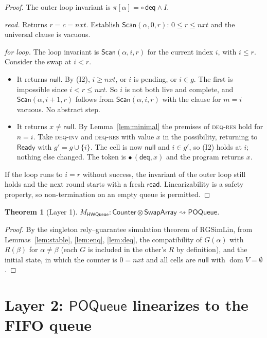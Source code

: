 \documentclass[11pt]{article}
\newtheorem{theorem}[lemma]{Theorem}
\theoremstyle{definition}
\theoremstyle{remark}
\newcommand{\dom}{\mathop{\mathrm{dom}}}
\newcommand{\Ready}{\mathsf{Ready}}
\newcommand{\Deq}{\mathsf{deq}}
\newcommand{\Read}{\mathsf{read}}
\newcommand{\nul}{\mathsf{null}}
\newcommand{\Scan}{\mathsf{Scan}}
\newcommand{\tokens}{\pi}
\newcommand{\Counter}{\mathsf{Counter}}
\newcommand{\SwapArray}{\mathsf{SwapArray}}
\newcommand{\POQueue}{\mathsf{POQueue}}
\newcommand{\HWQ}{\mathsf{HWQueue}}
\newcommand{\refines}{\rightsquigarrow}
\newcommand{\tok}[1]{\circ\,#1}
\newcommand{\done}[2]{\bullet\,(#1,#2)}
\begin{document}
\begin{proof}
The outer loop invariant is $\tokens[\alpha] = \tok{\Deq} \wedge I$.

\emph{read.}  Returns $r = c = \mathit{nxt}$.  Establish $\Scan(\alpha, 0, r)$:
$0 \le r \le \mathit{nxt}$ and the universal clause is vacuous.

\emph{for loop.}  The loop invariant is $\Scan(\alpha, i, r)$ for the current
index $i$, with $i \le r$.  Consider the swap at $i < r$.
\begin{itemize}[nosep]
\item It returns $\nul$.  By (I2), $i \ge \mathit{nxt}$, or $i$ is
  pending, or $i \in g$.  The first is impossible since $i < r \le
  \mathit{nxt}$.  So $i$ is not both live and complete, and
  $\Scan(\alpha, i+1, r)$ follows from $\Scan(\alpha, i, r)$ with the clause
  for $m = i$ vacuous.  No abstract step.
\item It returns $x \ne \nul$.  By Lemma~\ref{lem:minimal} the premises of
  \textsc{deq-res} hold for $n = i$.  Take \textsc{deq-inv} and
  \textsc{deq-res} with value $x$ in the possibility, returning to
  $\Ready$ with $g' = g \cup \{i\}$.  The cell is now $\nul$ and $i \in g'$,
  so (I2) holds at $i$; nothing else changed.  The token is
  $\done{\Deq}{x}$ and the program returns $x$.
\end{itemize}
If the loop runs to $i = r$ without success, the invariant of the outer loop
still holds and the next round starts with a fresh $\Read$.  Linearizability
is a safety property, so non-termination on an empty queue is permitted.
\end{proof}

\begin{theorem}[Layer 1]\label{thm:layer1}
$M_{\HWQ} : \Counter \otimes \SwapArray \refines \POQueue$.
\end{theorem}

\begin{proof}
By the singleton rely--guarantee simulation theorem of RGSimLin, from
Lemmas~\ref{lem:stable}, \ref{lem:enq}, \ref{lem:deq}, the compatibility of
$G(\alpha)$ with $R(\beta)$ for $\alpha \ne \beta$ (each $G$ is included in
the other's $R$ by definition), and the initial state, in which the counter
is $0 = \mathit{nxt}$ and all cells are $\nul$ with $\dom V = \emptyset$.
\end{proof}

\section{Layer 2: \texorpdfstring{$\POQueue$}{POQueue} linearizes to the FIFO queue}
\label{sec:layer2}
\end{document}
